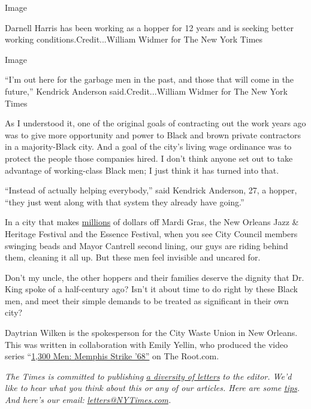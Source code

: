 Image

Darnell Harris has been working as a hopper for 12 years and is seeking
better working conditions.Credit...William Widmer for The New York Times

Image

``I'm out here for the garbage men in the past, and those that will come
in the future,'' Kendrick Anderson said.Credit...William Widmer for The
New York Times

As I understood it, one of the original goals of contracting out the
work years ago was to give more opportunity and power to Black and brown
private contractors in a majority-Black city. And a goal of the city's
living wage ordinance was to protect the people those companies hired. I
don't think anyone set out to take advantage of working-class Black men;
I just think it has turned into that.

``Instead of actually helping everybody,'' said Kendrick Anderson, 27, a
hopper, ``they just went along with that system they already have
going.''

In a city that makes
\href{https://www.wdsu.com/article/nungesser-new-orleans-region-to-see-a-billion-dollar-tax-revenue-loss-due-to-pandemic/32179410}{millions}
of dollars off Mardi Gras, the New Orleans Jazz \& Heritage Festival and
the Essence Festival, when you see City Council members swinging beads
and Mayor Cantrell second lining, our guys are riding behind them,
cleaning it all up. But these men feel invisible and uncared for.

Don't my uncle, the other hoppers and their families deserve the dignity
that Dr. King spoke of a half-century ago? Isn't it about time to do
right by these Black men, and meet their simple demands to be treated as
significant in their own city?

Daytrian Wilken is the spokesperson for the City Waste Union in New
Orleans. This was written in collaboration with Emily Yellin, who
produced the video series
``\href{https://www.theroot.com/c/1300-men-memphis-strike-68}{1,300 Men:
Memphis Strike '68''} on The Root.com.

\emph{The Times is committed to publishing}
\href{https://www.nytimes3xbfgragh.onion/2019/01/31/opinion/letters/letters-to-editor-new-york-times-women.html}{\emph{a
diversity of letters}} \emph{to the editor. We'd like to hear what you
think about this or any of our articles. Here are some}
\href{https://help.nytimes3xbfgragh.onion/hc/en-us/articles/115014925288-How-to-submit-a-letter-to-the-editor}{\emph{tips}}\emph{.
And here's our email:}
\href{mailto:letters@NYTimes.com}{\emph{letters@NYTimes.com}}\emph{.}

